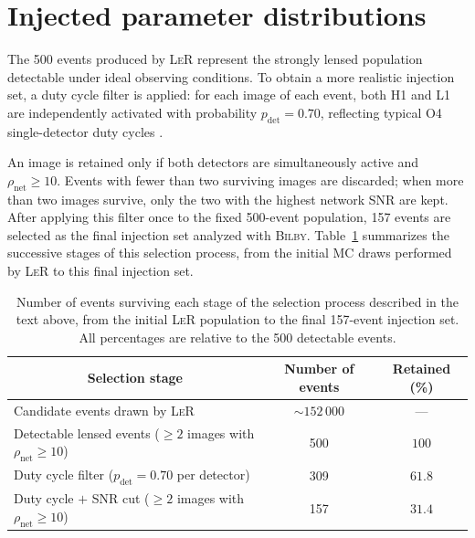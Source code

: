 \section{Injected parameter distributions}
\label{sec:injected_params}

The 500 events produced by \textsc{LeR} represent the strongly lensed population detectable under ideal observing conditions. To obtain a more realistic injection set, a duty cycle filter is applied: for each image of each event, both H1 and L1 are independently activated with probability $p_\mathrm{det} = 0.70$, reflecting typical O4 single-detector duty cycles \cite{GWTC5}.

An image is retained only if both detectors are simultaneously active and $\rho_\mathrm{net} \geq 10$. Events with fewer than two surviving images are discarded; when more than two images survive, only the two with the highest network SNR are kept. After applying this filter once to the fixed 500-event population, 157 events are selected as the final injection set analyzed with \textsc{Bilby}. Table~\ref{tab:selection_funnel} summarizes the successive stages of this selection process, from the initial MC draws performed by \textsc{LeR} to this final injection set.



\begin{table}[h!]
\centering
\renewcommand{\arraystretch}{1.2}
\begin{tabular}{lcc}
\hline\hline
\multicolumn{1}{c}{Selection stage} & Number of events & Retained (\%) \\
\hline
Candidate events drawn by \textsc{LeR} & $\sim 152\,000$ & --- \\
Detectable lensed events ($\geq 2$ images with 
$\rho_\mathrm{net} \geq 10$) & 500 & $100$ \\
Duty cycle filter ($p_\mathrm{det} = 0.70$ per 
detector) & 309 & $61.8$ \\
Duty cycle $+$ SNR cut ($\geq 2$ images with 
$\rho_\mathrm{net} \geq 10$) & 157 & $31.4$ \\
\hline
\end{tabular}
\caption{Number of events surviving each stage of the selection process described in the text above, from the initial \textsc{LeR} population to the final 157-event injection set. All percentages are relative to the 500 detectable events.}
\label{tab:selection_funnel}
\end{table}

